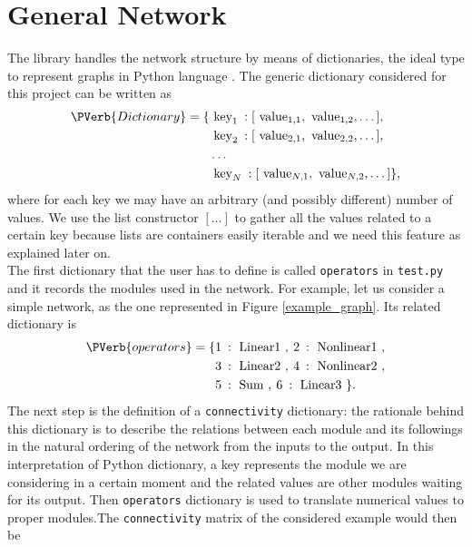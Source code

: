 \documentclass{article}
\begin{document}
\section{General Network}\label{sec_code}
The library handles the network structure by means of dictionaries, the ideal type to represent graphs in Python language . 
The generic dictionary considered for this project can be written as
\begin{align*}
\PVerb{Dictionary} =  \{  & \text{ key}_1  \: : [ \text{ value}_{1,1},  \text{ value}_{1,2}, \dots] ,  \\
&  \text{ key}_2  \: : [ \text{ value}_{2,1},  \text{ value}_{2,2},  \dots] , \\
& \dots \\
& \text{ key}_N  \: : [ \text{ value}_{N,1},  \text{ value}_{N,2},  \dots]  \},
\end{align*}
where for each key we may have an arbitrary (and possibly different) number of values. 
We use the list constructor $[ \dots ]$ to gather all the values related to a certain key because lists are containers easily iterable and we need this feature as explained later on. \\
The first dictionary that the user has to define is called \verb|operators| in \verb|test.py| and it records the modules used in the network. 
For example, let us consider a simple network, as the one represented in Figure \ref{example_graph}.
Its related dictionary is
\begin{align*}
\PVerb{operators} =  \{  & 1  \: :  \text{ Linear1 }, \: 2  \: : \text{ Nonlinear1 },\\
&  3  \: :  \text{ Linear2 }, \: 4  \: :  \text{ Nonlinear2 },\\
&  5  \: :  \text{ Sum }, \: 6 \: : \text{ Linear3 } \}.
\end{align*}
The next step is the definition of a \verb|connectivity| dictionary: the rationale behind this dictionary is to describe the relations between each module and its followings in the natural ordering of the network from the inputs to the output. In this interpretation of Python dictionary, a key represents the module we are considering in a certain moment and the related values are other modules waiting for its output. Then \verb|operators| dictionary is used to translate numerical values to proper modules.The \verb|connectivity| matrix of the considered example would then be
\end{document}
